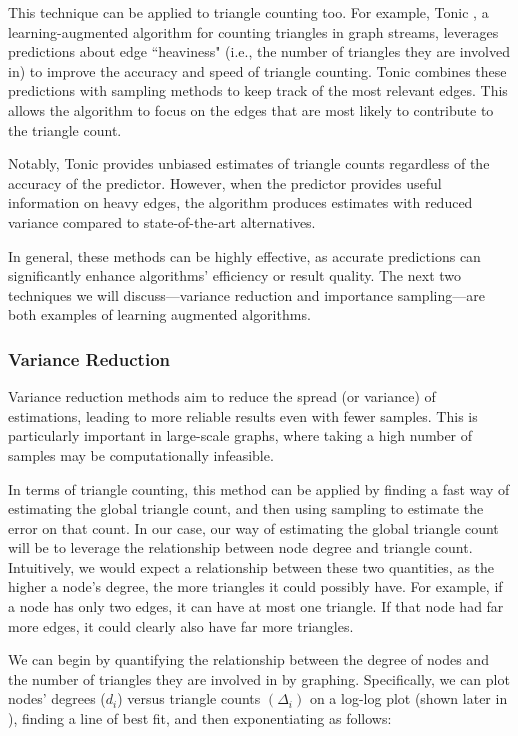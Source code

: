 \documentclass[11pt, margin=1in]{article}
\begin{document}
This technique can be applied to triangle counting too.
For example, Tonic \cite{boldrin_fast_2024}, a learning-augmented algorithm for counting triangles in graph streams, leverages predictions about edge ``heaviness" (i.e., the number of triangles they are involved in) to improve the accuracy and speed of triangle counting.
Tonic combines these predictions with sampling methods to keep track of the most relevant edges.
This allows the algorithm to focus on the edges that are most likely to contribute to the triangle count.

Notably, Tonic provides unbiased estimates of triangle counts regardless of the accuracy of the predictor.
However, when the predictor provides useful information on heavy edges, the algorithm produces estimates with reduced variance compared to state-of-the-art alternatives.

In general, these methods can be highly effective, as accurate predictions can significantly enhance algorithms' efficiency or result quality.
The next two techniques we will discuss—variance reduction and importance sampling—are both examples of learning augmented algorithms.

\subsubsection{Variance Reduction}
\label{sec:variance-reduction-background}

Variance reduction methods \cite{prescott_monte_1965} aim to reduce the spread (or variance) of estimations, leading to more reliable results even with fewer samples.
This is particularly important in large-scale graphs, where taking a high number of samples may be computationally infeasible.

In terms of triangle counting, this method can be applied by finding a fast way of estimating the global triangle count, and then using sampling to estimate the error on that count.
In our case, our way of estimating the global triangle count will be to leverage the relationship between node degree and triangle count.
Intuitively, we would expect a relationship between these two quantities, as the higher a node's degree, the more triangles it could possibly have.
For example, if a node has only two edges, it can have at most one triangle.
If that node had far more edges, it could clearly also have far more triangles.

We can begin by quantifying the relationship between the degree of nodes and the number of triangles they are involved in by graphing.
Specifically, we can plot nodes' degrees ($d_i$) versus triangle counts $(\Delta_i)$ on a log-log plot (shown later in ), finding a line of best fit, and then exponentiating as follows:
\end{document}
